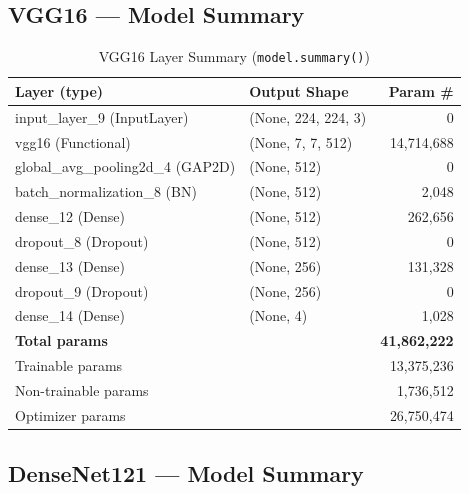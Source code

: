 \documentclass[12pt,a4paper]{article}
\begin{document}
\subsection{VGG16 --- Model Summary}

\begin{table}[H]
\centering
\caption{VGG16 Layer Summary (\texttt{model.summary()})}
\label{tab:summary_vgg16}
\begin{tabular}{l l r}
  \toprule
  \textbf{Layer (type)} & \textbf{Output Shape} & \textbf{Param \#} \\
  \midrule
  input\_layer\_9 (InputLayer)         & (None, 224, 224, 3) &            0 \\
  vgg16 (Functional)                   & (None, 7, 7, 512)   &   14,714,688 \\
  global\_avg\_pooling2d\_4 (GAP2D)    & (None, 512)         &            0 \\
  batch\_normalization\_8 (BN)         & (None, 512)         &        2,048 \\
  dense\_12 (Dense)                    & (None, 512)         &      262,656 \\
  dropout\_8 (Dropout)                 & (None, 512)         &            0 \\
  dense\_13 (Dense)                    & (None, 256)         &      131,328 \\
  dropout\_9 (Dropout)                 & (None, 256)         &            0 \\
  dense\_14 (Dense)                    & (None, 4)           &        1,028 \\
  \midrule
  \multicolumn{2}{l}{\textbf{Total params}}    & \textbf{41,862,222} \\
  \multicolumn{2}{l}{Trainable params}         &         13,375,236 \\
  \multicolumn{2}{l}{Non-trainable params}     &          1,736,512 \\
  \multicolumn{2}{l}{Optimizer params}         &         26,750,474 \\
  \bottomrule
\end{tabular}
\end{table}

\subsection{DenseNet121 --- Model Summary}
\end{document}
